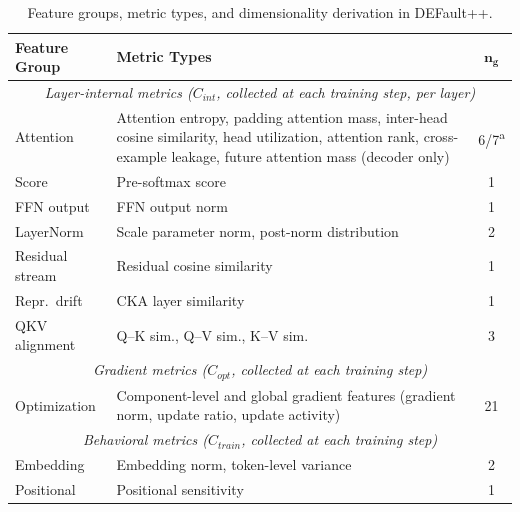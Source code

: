 \begin{table}[!htbp]
\caption{Feature groups, metric types, and dimensionality derivation in DEFault++.}
\label{tab:defaultpp_features}
\centering
\footnotesize
\renewcommand{\arraystretch}{1.05}
\begin{tabularx}{\linewidth}{@{} p{1.7cm} X c @{}}
\toprule
\textbf{Feature Group} & \textbf{Metric Types} & $\mathbf{n_g}$ \\
\midrule

\multicolumn{3}{c}{\textit{Layer-internal metrics ($C_{int}$, collected at each training step, per layer)}} \\[2pt]

Attention & Attention entropy, padding attention mass, inter-head cosine similarity, head utilization, attention rank, cross-example leakage, future attention mass (decoder only) & 6/7\textsuperscript{a} \\[2pt]

Score & Pre-softmax score & 1 \\[2pt]

FFN output & FFN output norm & 1 \\[2pt]

LayerNorm & Scale parameter norm, post-norm distribution & 2 \\[2pt]

Residual stream & Residual cosine similarity & 1 \\[2pt]

Repr.\ drift & CKA layer similarity & 1 \\[2pt]

QKV alignment & Q--K sim., Q--V sim., K--V sim. & 3 \\[2pt]

\midrule
\multicolumn{3}{c}{\textit{Gradient metrics ($C_{opt}$, collected at each training step)}} \\[2pt]

Optimization & Component-level and global gradient features (gradient norm, update ratio, update activity) & 21 \\[2pt]

\midrule
\multicolumn{3}{c}{\textit{Behavioral metrics ($C_{train}$, collected at each training step)}} \\[2pt]

Embedding & Embedding norm, token-level variance & 2 \\[2pt]

Positional & Positional sensitivity & 1 \\[2pt]


\end{tabularx}
\end{table}
